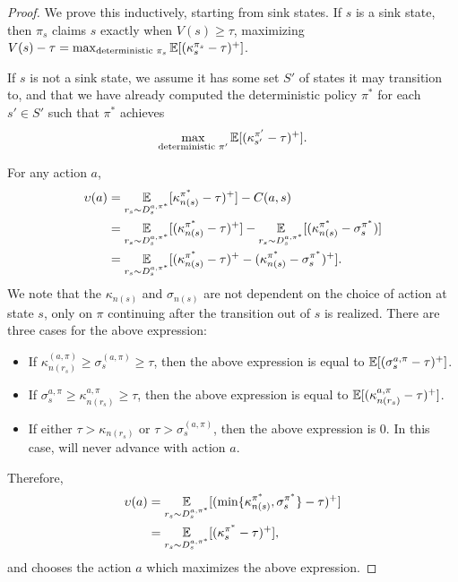 \begin{proof}
	We prove this inductively, starting from sink states.
	If $s$ is a sink state, then $\pi_{s}$ claims $s$ exactly when $V(s) \geq \tau$, maximizing $V(s) - \tau = \max_{\text{deterministic } \pi_s} \operatorname*{\mathbb{E}}[(\kappa_{s}^{\pi_s} - \tau)^+]$.

	If $s$ is not a sink state, we assume it has some set $S'$ of states it may transition to, and that we have already computed the deterministic policy $\pi^*$ for each $s'\in S'$ such that $\pi^*$ achieves
	\begin{align*}
		\max_{\text{deterministic }\pi'} \operatorname*{\mathbb{E}}[(\kappa_{s'}^{\pi'} - \tau)^+].
	\end{align*}

	For any action $a$,
	\begin{align*}
		\upsilon(a) &= \operatorname*{\mathbb{E}}_{r_s \sim D_s^{a,\pi^*}}[\kappa_{n(s)}^{\pi^*}-\tau)^+] - C(a,s)\\
		&= \operatorname*{\mathbb{E}}_{r_s \sim D_s^{a,\pi^*}}[(\kappa_{n(s)}^{\pi^*}-\tau)^+] - \operatorname*{\mathbb{E}}_{r_s \sim D_s^{a,\pi^*}}[(\kappa_{n(s)}^{\pi^*}-\sigma_s^{\pi^*})] \\
		&= \operatorname*{\mathbb{E}}_{r_s \sim D_s^{a,\pi^*}}[(\kappa_{n(s)}^{\pi^*}-\tau)^+ - (\kappa_{n(s)}^{\pi^*}-\sigma_s^{\pi^*})^+] .
	\end{align*}
	We note that the $\kappa_{n(s)}$ and $\sigma_{n(s)}$ are not dependent on the choice of action at state $s$, only on $\pi$ continuing after the transition out of $s$ is realized.
	There are three cases for the above expression:
	\begin{itemize}
		\item If $\kappa_{n(r_s)}^{(a,\pi)} \geq \sigma_s^{(a,\pi)} \geq \tau$, then the above expression is equal to $\operatorname*{\mathbb{E}} [(\sigma_s^{a,\pi}-\tau)^+]$.
		\item If $\sigma_s^{a,\pi} \geq \kappa_{n(r_s)}^{a,\pi} \geq \tau$, then the above expression is equal to $\operatorname*{\mathbb{E}} [(\kappa_{n(r_s)}^{a,\pi}-\tau)^+]$.
		\item If either $\tau > \kappa_{n(r_s)}$ or $\tau > \sigma_s^{(a,\pi)}$, then the above expression is 0. In this case, \MAXSAUP{} will never advance with action $a$.
	\end{itemize}
	Therefore,
	\begin{align*}
		\upsilon(a)	&= \operatorname*{\mathbb{E}}_{r_s \sim D_s^{a,\pi^*}}[(\min\{\kappa_{n(s)}^{\pi^*},\sigma_s^{\pi^*}\}-\tau)^+]  \\
		&= \operatorname*{\mathbb{E}}_{r_s \sim D_s^{a,\pi^*}}[(\kappa_s^{\pi^*}-\tau)^+],
	\end{align*}
	and \MAXSAUP{} chooses the action $a$ which maximizes the above expression.
\end{proof}


